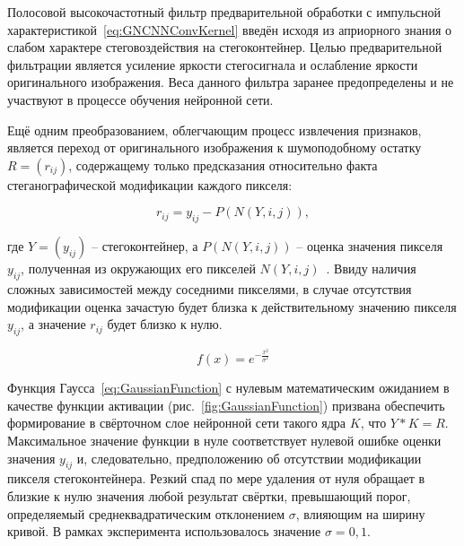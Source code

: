 Полосовой высокочастотный фильтр предварительной обработки с импульсной характеристикой~\eqref{eq:GNCNNConvKernel} введён исходя из априорного знания о слабом характере стеговоздействия на стегоконтейнер. Целью предварительной фильтрации является усиление яркости стегосигнала и ослабление яркости оригинального изображения. Веса данного фильтра заранее предопределены и не участвуют в процессе обучения нейронной сети.

Ещё одним преобразованием, облегчающим процесс извлечения признаков, является переход от оригинального изображения к шумоподобному остатку $ R = (r_{ij}) $, содержащему только предсказания относительно факта стеганографической модификации каждого пикселя:

\begin{equation*}
r_{ij} = y_{ij} - P(N(Y, i, j)),
\end{equation*}

где $ Y = (y_{ij}) $ – стегоконтейнер, а $ P(N(Y, i, j)) $ – оценка значения пикселя $ y_{ij} $, полученная из окружающих его пикселей $ N(Y, i, j) $~\cite{FridrichNoiseResidual}. Ввиду наличия сложных зависимостей между соседними пикселями, в случае отсутствия модификации оценка зачастую будет близка к действительному значению пикселя $ y_{ij} $, а значение $ r_{ij} $ будет близко к нулю.

\begin{equation}
\label{eq:GaussianFunction}
f(x) = e^{-\frac{x^2}{\sigma^2}}
\end{equation}

Функция Гаусса~\eqref{eq:GaussianFunction} с нулевым математическим ожиданием в качестве функции активации (рис.~\ref{fig:GaussianFunction}) призвана обеспечить формирование в свёрточном слое нейронной сети такого ядра $ K $, что $ Y*K = R $. Максимальное значение функции в нуле соответствует нулевой ошибке оценки значения $ y_{ij} $ и, следовательно, предположению об отсутствии модификации пикселя стегоконтейнера. Резкий спад по мере удаления от нуля обращает в близкие к нулю значения любой результат свёртки, превышающий порог, определяемый среднеквадратическим отклонением $ \sigma $, влияющим на ширину кривой. В рамках эксперимента использовалось значение $ \sigma = 0,1 $.

